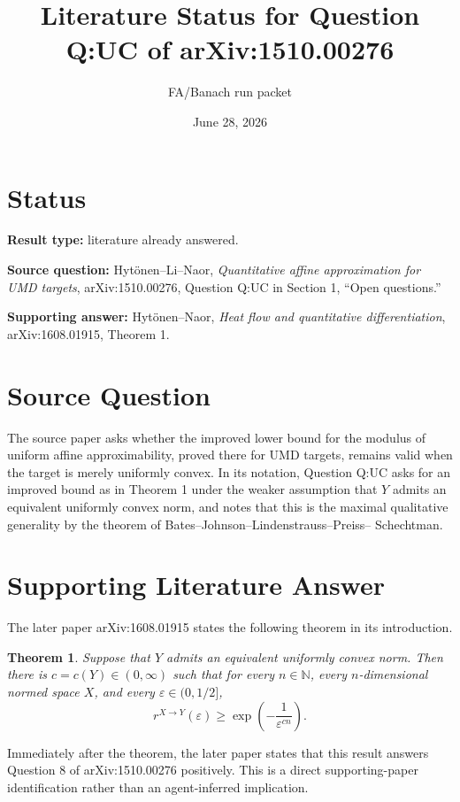 \documentclass[11pt]{article}
\title{Literature Status for Question Q:UC of arXiv:1510.00276}
\author{FA/Banach run packet}
\date{June 28, 2026}
\newtheorem*{theorem}{Theorem}
\begin{document}
\maketitle

\section*{Status}

\textbf{Result type:} literature already answered.

\textbf{Source question:} Hytönen--Li--Naor,
\emph{Quantitative affine approximation for UMD targets}, arXiv:1510.00276,
Question Q:UC in Section 1, ``Open questions.''

\textbf{Supporting answer:} Hytönen--Naor,
\emph{Heat flow and quantitative differentiation}, arXiv:1608.01915,
Theorem 1.

\section*{Source Question}

The source paper asks whether the improved lower bound for the modulus of
uniform affine approximability, proved there for UMD targets, remains valid
when the target is merely uniformly convex. In its notation, Question Q:UC asks
for an improved bound as in Theorem 1 under the weaker assumption that \(Y\)
admits an equivalent uniformly convex norm, and notes that this is the maximal
qualitative generality by the theorem of Bates--Johnson--Lindenstrauss--Preiss--
Schechtman.

\section*{Supporting Literature Answer}

The later paper arXiv:1608.01915 states the following theorem in its
introduction.

\begin{theorem}
Suppose that \(Y\) admits an equivalent uniformly convex norm. Then there is
\(c=c(Y)\in(0,\infty)\) such that for every \(n\in\mathbb N\), every
\(n\)-dimensional normed space \(X\), and every \(\varepsilon\in(0,1/2]\),
\[
  r^{X\to Y}(\varepsilon)\ge \exp\left(-\frac{1}{\varepsilon^{c n}}\right).
\]
\end{theorem}

Immediately after the theorem, the later paper states that this result answers
Question 8 of arXiv:1510.00276 positively. This is a direct supporting-paper
identification rather than an agent-inferred implication.
\end{document}
